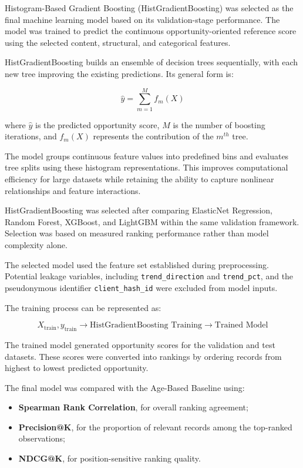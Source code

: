 \documentclass[12pt,a4paper]{report}
\begin{document}
Histogram-Based Gradient Boosting (HistGradientBoosting) was selected as the final machine learning model based on its validation-stage performance. The model was trained to predict the continuous opportunity-oriented reference score using the selected content, structural, and categorical features.

HistGradientBoosting builds an ensemble of decision trees sequentially, with each new tree improving the existing predictions. Its general form is:

\begin{equation}
\hat{y} =
\sum_{m=1}^{M}
f_m(X)
\end{equation}

where $\hat{y}$ is the predicted opportunity score, $M$ is the number of boosting iterations, and $f_m(X)$ represents the contribution of the $m^{th}$ tree.

The model groups continuous feature values into predefined bins and evaluates tree splits using these histogram representations. This improves computational efficiency for large datasets while retaining the ability to capture nonlinear relationships and feature interactions.

HistGradientBoosting was selected after comparing ElasticNet Regression, Random Forest, XGBoost, and LightGBM within the same validation framework. Selection was based on measured ranking performance rather than model complexity alone.

The selected model used the feature set established during preprocessing. Potential leakage variables, including \texttt{trend\_direction} and \texttt{trend\_pct}, and the pseudonymous identifier \texttt{client\_hash\_id} were excluded from model inputs.

The training process can be represented as:

\begin{equation}
X_{\text{train}}, y_{\text{train}}
\rightarrow
\text{HistGradientBoosting Training}
\rightarrow
\text{Trained Model}
\end{equation}

The trained model generated opportunity scores for the validation and test datasets. These scores were converted into rankings by ordering records from highest to lowest predicted opportunity.

The final model was compared with the Age-Based Baseline using:

\begin{itemize}
    \item \textbf{Spearman Rank Correlation}, for overall ranking agreement;
    \item \textbf{Precision@K}, for the proportion of relevant records among the top-ranked observations;
    \item \textbf{NDCG@K}, for position-sensitive ranking quality.
\end{itemize}
\end{document}
